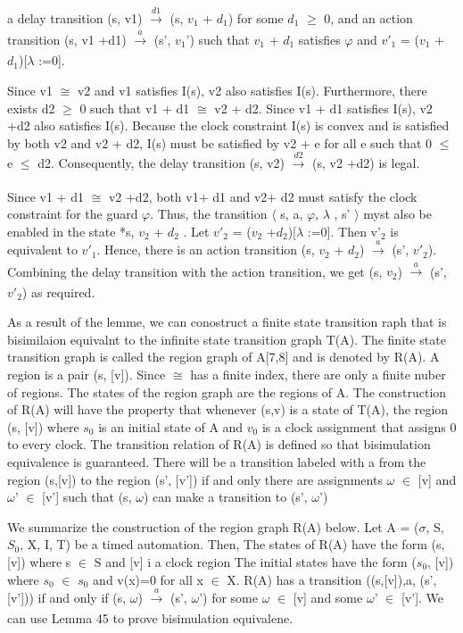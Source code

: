 a delay transition (s, v1)  $\xrightarrow[]{d1}$ (s, $v_1$ + $d_1$) for some $d_1$ $\geq$ 0, and
an action transition   (s, v1 +d1)  $\xrightarrow[]{a}$ (s', $v_1$') such that $v_1$ + $d_1$ satisfies $\varphi$ and $v'_1$ = ($v_1$ + $d_1$)[$\lambda$ :=0].



Since v1 $\cong$ v2 and v1 satisfies I(s), v2 also satisfies I(s). Furthermore, there exists d2 $\geq$ 0 such that v1 + d1 $\cong$ v2 + d2. Since v1 + d1 satisfies I(s), v2 +d2 also satisfies I(s). Because the clock constraint I(s) is convex and is satisfied by both v2 and v2 + d2, I(s) must be satisfied by v2 + e for all e such that 0 $\leq$ e $\leq$ d2. Consequently, the delay transition (s, v2)  $\xrightarrow[]{d2}$ (s, v2 +d2) is legal.

Since v1 + d1 $\cong$ v2 +d2, both v1+ d1 and v2+ d2 must satisfy the clock constraint for the guard $\varphi$. Thus, the transition $\langle$ s, a, $\varphi$, $\lambda$ , s' $\rangle$ myst also be enabled in the state  *s, $v_2$ + $d_2$
. Let $v'_2$ = ($v_2$ +$d_2$)[$\lambda$ :=0]. Then v'$_2$ is equivalent to $v'_1$. Hence, there is an action transition (s, $v_2$ + $d_2$)  $\xrightarrow[]{a}$  (s', $v'_2$). Combining the delay transition with the action transition, we get (s, $v_2$)  $\xrightarrow[]{a}$ (s', $v'_2$) as required.

As a result of the lemme, we can conostruct a finite state transition raph that is  bisimilaion equivalnt to the infinite state transition graph T(A). The finite state transition graph is called the region graph of A[7,8] and is denoted by R(A). A region is a pair (s, [v]). Since $\cong$  has a finite index, there are only a finite nuber of regions. The states of the region graph are  the regions of A. The construction of R(A) will have the property that whenever (s,v) is a state of T(A), the region (s, [v]) where $s_0$ is an initial state of A and $v_0$ is a clock assignment that assigns 0 to every clock. The transition relation of R(A) is defined so that bisimulation equivalence is guaranteed. There will be a transition labeled with a from the region (s,[v]) to the region (s', [v']) if and only there are assignments $\omega$ $\in$ [v] and $\omega$' $\in$ [v'] such that (s, $\omega$) can make a transition to (s', $\omega$')

We summarize the construction of the region graph R(A) below. Let A = ($\sigma$, S, $S_0$, X, I, T) be a timed automation. Then,
The states of R(A) have the form (s, [v]) where s $\in$ S and [v] i a clock region
The initial states have the form ($s_0$, [v]) where $s_0$ $\in$ $s_0$ and v(x)=0 for all x $\in$ X.
R(A) has a transition ((s,[v]),a, (s',[v'])) if and only if (s, $\omega$)  $\xrightarrow[]{a}$  (s', $\omega$') for some $\omega$ $\in$ [v] and some $\omega$' $\in$ [v'].
We can use Lemma 45 to prove bisimulation equivalene.

